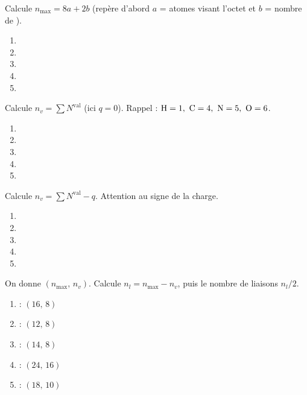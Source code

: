 \documentclass[11pt,a4paper]{article}
\begin{document}
\begin{exo}
Calcule $n_{\max} = 8a + 2b$ (repère d'abord $a$ = atomes visant l'octet et $b$ = nombre de ).
\begin{enumerate}[label=\alph*)]
  \item {}
  \item {}
  \item {}
  \item {}
  \item {}
\end{enumerate}
\end{exo}

\begin{exo}
Calcule $n_{v} = \sum N^{\text{val}}$ (ici $q=0$). Rappel : $\ce{H}=1,\ \ce{C}=4,\ \ce{N}=5,\ \ce{O}=6$.
\begin{enumerate}[label=\alph*)]
  \item {}
  \item {}
  \item {}
  \item {}
  \item {}
\end{enumerate}
\end{exo}

\begin{exo}
Calcule $n_{v} = \sum N^{\text{val}} - q$. Attention au signe de la charge.
\begin{enumerate}[label=\alph*)]
  \item {}
  \item {}
  \item {}
  \item {}
  \item {}
\end{enumerate}
\end{exo}

\begin{exo}
On donne $(n_{\max},\,n_v)$. Calcule $n_l = n_{\max} - n_v$, puis le nombre de liaisons $n_l/2$.
\begin{enumerate}[label=\alph*)]
  \item {} : $(16,\,8)$
  \item {} : $(12,\,8)$
  \item {} : $(14,\,8)$
  \item {} : $(24,\,16)$
  \item {} : $(18,\,10)$
\end{enumerate}
\end{exo}
\end{document}
